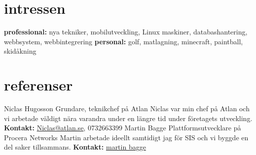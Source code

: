 \documentclass[]{friggeri-cv} %
\begin{document}

\section{intressen}

\textbf{professional:} nya tekniker, mobilutveckling, Linux maskiner, databashantering, webbsystem, webbintegrering \textbf{personal:} golf, matlagning, minecraft, paintball, skidåkning


\section{referenser}
\begin{entrylist}
	\entry
	{}
	{Niclas Hugosson}
	{Grundare, teknikchef på Atlan}
	{Niclas var min chef på Atlan och vi arbetade väldigt nära varandra under en längre tid under företagets utveckling. \textbf{Kontakt:} \href{mailto:niclas@atlan.se}{Niclas@atlan.se}, 0732663399}
	\entry
	{}
	{Martin Bagge}
	{Plattformsutvecklare på Procera Networks}
	{Martin arbetade ideellt samtidigt jag för SIS och vi byggde en del saker tillsammans. \textbf{Kontakt:} \href{mailto:bagge}{martin bagge}}
\end{entrylist}



\end{document}
